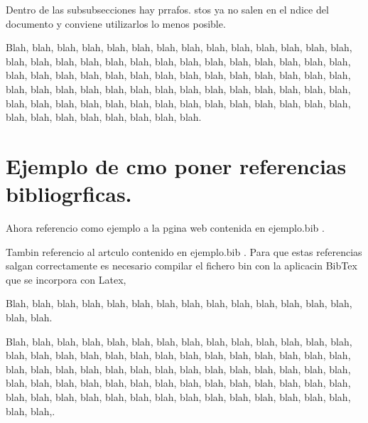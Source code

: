 Dentro de las subsubsecciones  hay prrafos. stos ya no salen en el ndice del documento y conviene utilizarlos lo menos posible.

Blah, blah, blah, blah, blah, blah, blah, blah, blah, blah, blah, blah, blah,
blah, blah, blah, blah, blah, blah, blah, blah, blah, blah, blah, blah, blah,
blah, blah, blah, blah, blah, blah, blah, blah, blah, blah, blah, blah, blah,
blah, blah, blah, blah, blah, blah, blah, blah, blah, blah, blah, blah, blah,
blah, blah, blah, blah, blah, blah, blah, blah, blah, blah, blah, blah, blah,
blah, blah, blah, blah, blah, blah, blah, blah, blah, blah, blah, blah, blah.

\section{Ejemplo de cmo poner referencias bibliogrficas.}

Ahora referencio como ejemplo a la pgina web contenida en ejemplo.bib \cite{enlace}.

Tambin referencio al artculo contenido en ejemplo.bib \cite{tu:95}. Para que estas referencias salgan correctamente es necesario compilar el fichero bin con la aplicacin BibTex que se incorpora con Latex,

Blah, blah, blah, blah, blah, blah, blah, blah, blah, blah, blah, blah, blah, blah,
blah, blah.

Blah, blah, blah, blah, blah, blah, blah, blah, blah, blah, blah, blah, blah,
blah, blah, blah, blah, blah, blah, blah, blah, blah, blah, blah, blah, blah,
blah, blah, blah, blah, blah, blah, blah, blah, blah, blah, blah, blah, blah,
blah, blah, blah, blah, blah, blah, blah, blah, blah, blah, blah, blah, blah,
blah, blah, blah, blah, blah, blah, blah, blah, blah, blah, blah, blah, blah,
blah, blah, blah, blah, blah, blah, blah,.
